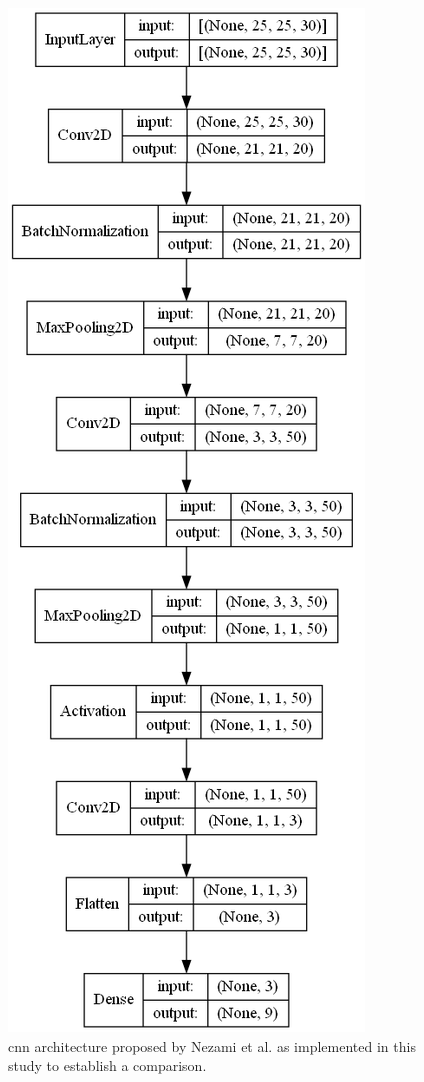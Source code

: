 \begin{figure}[bp]
    \centering
    \includegraphics[width=\linewidth]{figs/vineyard_classification/networks/nezami_25x24_20.png}
	\caption{\acrshort{cnn} architecture proposed by Nezami et al. \cite{nezami_tree_2020} as implemented in this study to establish a comparison. }
	\label{fig:nezami_cnn}
\end{figure}

